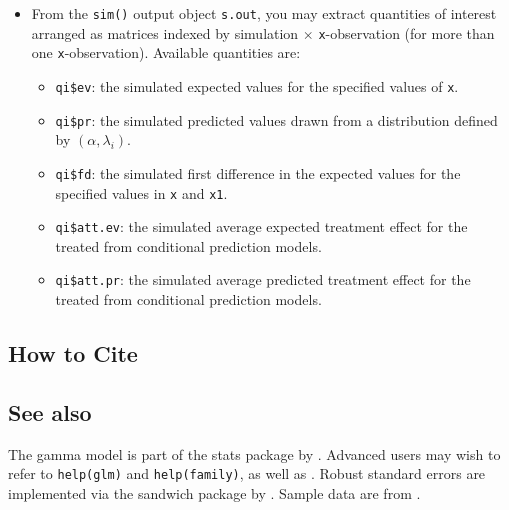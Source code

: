 \documentclass{article}
\begin{document}
\begin{itemize}
\item From the {\tt sim()} output object {\tt s.out}, you may extract
  quantities of interest arranged as matrices indexed by simulation
  $\times$ {\tt x}-observation (for more than one {\tt x}-observation).
  Available quantities are:

   \begin{itemize}
   \item {\tt qi\$ev}: the simulated expected values for the specified
     values of {\tt x}.
   \item {\tt qi\$pr}: the simulated predicted values drawn from a
     distribution defined by $(\alpha, \lambda_i)$.
   \item {\tt qi\$fd}: the simulated first difference in the expected
     values for the specified values in {\tt x} and {\tt x1}.
   \item {\tt qi\$att.ev}: the simulated average expected treatment
     effect for the treated from conditional prediction models.  
   \item {\tt qi\$att.pr}: the simulated average predicted treatment
     effect for the treated from conditional prediction models.  
   \end{itemize}
\end{itemize}


\subsection* {How to Cite} 


\CiteZelig

\subsection* {See also}
The gamma model is part of the stats package by \citet{VenRip02}.
Advanced users may wish to refer to \texttt{help(glm)} and
\texttt{help(family)}, as well as \cite{McCNel89}. Robust standard
errors are implemented via the sandwich package by \citet{Zeileis04}.
Sample data are from \cite{KinTomWit00}.



 
\end{document}
